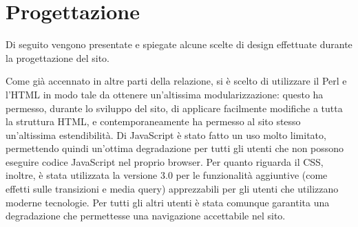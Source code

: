 \section{Progettazione}

Di seguito vengono presentate e spiegate alcune scelte di design effettuate durante la progettazione del sito.


Come già accennato in altre parti della relazione, si è scelto di utilizzare il Perl e l'HTML in modo tale da ottenere un'altissima modularizzazione: questo ha permesso, durante lo sviluppo del sito, di applicare facilmente modifiche a tutta la struttura HTML, e contemporaneamente ha permesso al sito stesso un'altissima estendibilità. Di JavaScript \`e stato fatto un uso molto limitato, permettendo quindi un'ottima degradazione per tutti gli utenti che non possono eseguire codice JavaScript nel proprio browser. Per quanto riguarda il CSS, inoltre, è stata utilizzata la versione 3.0 per le funzionalità aggiuntive (come effetti sulle transizioni e media query) apprezzabili per gli utenti che utilizzano moderne tecnologie. Per tutti gli altri utenti è stata comunque garantita una degradazione che permettesse una navigazione accettabile nel sito.
